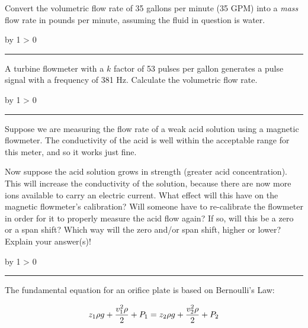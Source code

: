 \documentclass[12pt,a4paper]{article}
\def\oppgave{
            \advance\questnum by 1
            \ifnum \questnum > 0
                 \hrule
                 \vskip 3pt
                 \leftline{Oppgave \the\questnum}
                 \vskip 3pt \fi}
\begin{document}
Convert the volumetric flow rate of 35 gallons per minute (35 GPM) into a {\it mass} flow rate in pounds per minute, assuming the fluid in question is water.

\vskip 10pt \filbreak 
\oppgave{} 

A turbine flowmeter with a $k$ factor of 53 pulses per gallon generates a pulse signal with a frequency of 381 Hz.  Calculate the volumetric flow rate.

\vskip 10pt \filbreak 
\oppgave{} 

Suppose we are measuring the flow rate of a weak acid solution using a magnetic flowmeter.  The conductivity of the acid is well within the acceptable range for this meter, and so it works just fine.

Now suppose the acid solution grows in strength (greater acid concentration).  This will increase the conductivity of the solution, because there are now more ions available to carry an electric current.  What effect will this have on the magnetic flowmeter's calibration?  Will someone have to re-calibrate the flowmeter in order for it to properly measure the acid flow again?  If so, will this be a zero or a span shift?  Which way will the zero and/or span shift, higher or lower?  Explain your answer(s)!

\vskip 10pt \filbreak 
\oppgave{} 

The fundamental equation for an orifice plate is based on Bernoulli's Law:

$$z_1 \rho g + {v_1^2 \rho \over 2} + P_1 = z_2 \rho g + {v_2^2 \rho \over 2} + P_2$$
\end{document}
